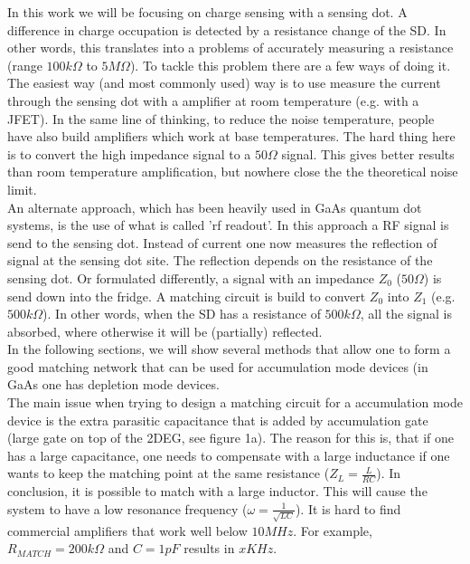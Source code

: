 \documentclass{article}
\begin{document}
	In this work we will be focusing on charge sensing with a sensing dot. A difference in charge occupation is detected by a resistance change of the SD. In other words, this translates into a problems of accurately measuring a resistance (range $100k\Omega$ to $5M\Omega$). To tackle this problem there are a few ways of doing it.\\
	The easiest way (and most commonly used) way is to use measure the current through the sensing dot with a amplifier at room temperature (e.g. with a JFET). In the same line of thinking, to reduce the noise temperature, people have also build amplifiers which work at base temperatures. The hard thing here is to convert the high impedance signal to a $50\Omega$ signal. This gives better results than room temperature amplification, but nowhere close the the theoretical noise limit.\\
	An alternate approach, which has been heavily used in GaAs quantum dot systems, is the use of what is called 'rf readout'. In this approach a RF signal is send to the sensing dot. Instead of current one now measures the reflection of signal at the sensing dot site. The reflection depends on the resistance of the sensing dot. Or formulated differently, a signal with an impedance $Z_0$ ($50\Omega$) is send down into the fridge. A matching circuit is build to convert $Z_0$ into $Z_1$ (e.g. $500k\Omega$). In other words, when the SD has a resistance of $500k\Omega$, all the signal is absorbed, where otherwise it will be (partially) reflected.\\
	In the  following sections, we will show several methods that allow one to form a good matching network that can be used for accumulation mode devices (in GaAs one has depletion mode devices. \\
	The main issue when trying to design a matching circuit for a accumulation mode device is the extra parasitic capacitance that is added by accumulation gate (large gate on top of the 2DEG, see figure 1a). The reason for this is, that if one has a large capacitance, one needs to compensate with a large inductance if one wants to keep the matching point at the same resistance ($Z_L = \frac{L}{RC}$). In conclusion, it is possible to match with a large inductor. This will cause the system to have a low resonance frequency ($\omega = \frac{1}{\sqrt{LC}}$). It is hard to find commercial amplifiers that work well below $10MHz$. For example, $R_{MATCH} = 200k\Omega$ and $C = 1pF$ results in $x KHz$.
	\\ \\
\end{document}
